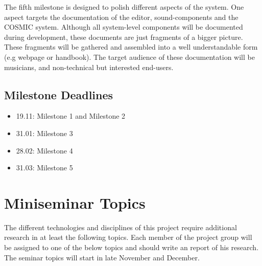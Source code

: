The fifth milestone is designed to polish different aspects of the system. 
One aspect targets the documentation of the editor, sound-components and the \ac{COSMIC} system. 
Although all system-level components will be documented during development, these documents are just fragments of a bigger picture. 
These fragments will be gathered and assembled into a well understandable form (e.g webpage or handbook). 
The target audience of these documentation will be musicians, and non-technical but interested end-users.

\subsection{Milestone Deadlines}

\begin{itemize}
\item 19.11: Milestone 1 and Milestone 2
\item 31.01: Milestone 3
\item 28.02: Milestone 4
\item 31.03: Milestone 5
\end{itemize}  

\section{Miniseminar Topics}
The different technologies and disciplines of this project require additional research in at least the following topics.
Each member of the project group will be assigned to one of the below topics and should write an report of his research.
The seminar topics will start in late November and December.

